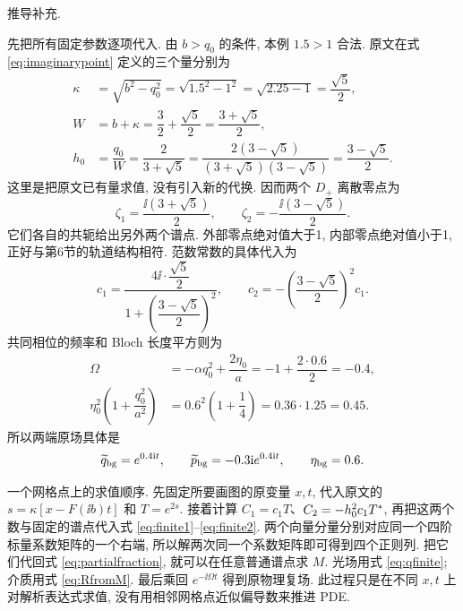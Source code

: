 \par\medskip\noindent 推导补充.\par

\par\smallskip\noindent 先把所有固定参数逐项代入.\quad
由 $b>q_0$ 的条件, 本例 $1.5>1$ 合法. 原文在式 \eqref{eq:imaginarypoint} 定义的三个量分别为
\begin{align*}
\kappa&=\sqrt{b^2-q_0^2}=\sqrt{1.5^2-1^2}
=\sqrt{2.25-1}=\dfrac{\sqrt{5}}{2},\\
 W&=b+\kappa=\dfrac{3}{2}+\dfrac{\sqrt{5}}{2}
=\dfrac{3+\sqrt{5}}{2},\\
h_0&=\dfrac{q_0}{W}=\dfrac{2}{3+\sqrt{5}}
=\dfrac{2(3-\sqrt{5})}{(3+\sqrt{5})(3-\sqrt{5})}
=\dfrac{3-\sqrt{5}}{2}.
\end{align*}
这里是把原文已有量求值, 没有引入新的代换. 因而两个 $D_+$ 离散零点为
\begin{equation*}
\zeta_1=\dfrac{\ii(3+\sqrt{5})}{2},\qquad
\zeta_2=-\dfrac{\ii(3-\sqrt{5})}{2}.
\end{equation*}
它们各自的共轭给出另外两个谱点. 外部零点绝对值大于1, 内部零点绝对值小于1, 正好与第6节的轨道结构相符. 范数常数的具体代入为
\begin{equation*}
c_1=\dfrac{4\ii\cdot\dfrac{\sqrt{5}}{2}}
{1+\left(\dfrac{3-\sqrt{5}}{2}\right)^2},\qquad
c_2=-\left(\dfrac{3-\sqrt{5}}{2}\right)^2c_1.
\end{equation*}
共同相位的频率和 Bloch 长度平方则为
\begin{align*}
\Omega&=-\alpha q_0^2+\dfrac{2\eta_0}{a}
=-1+\dfrac{2\cdot0.6}{2}=-0.4,\\
\eta_0^2\left(1+\dfrac{q_0^2}{a^2}\right)
&=0.6^2\left(1+\dfrac{1}{4}\right)
=0.36\cdot1.25=0.45.
\end{align*}
所以两端原场具体是
\begin{equation*}
\widetilde q_{\rm bg}=e^{0.4\mathrm{i} t},\qquad
\widetilde p_{\rm bg}=-0.3\mathrm{i} e^{0.4\mathrm{i} t},\qquad
\eta_{\rm bg}=0.6.
\end{equation*}

\par\smallskip\noindent 一个网格点上的求值顺序.\quad
先固定所要画图的原变量 $x,t$, 代入原文的 $s=\kappa[x-F(\ii b)t]$ 和 $T=e^{2s}$. 接着计算 $C_1=c_1T$、$C_2=-h_0^2c_1{T}^{*}$, 再把这两个数与固定的谱点代入式 \eqref{eq:finite1}--\eqref{eq:finite2}. 两个向量分量分别对应同一个四阶标量系数矩阵的一个右端, 所以解两次同一个系数矩阵即可得到四个正则列. 把它们代回式 \eqref{eq:partialfraction}, 就可以在任意普通谱点求 $M$. 光场用式 \eqref{eq:qfinite}; 介质用式 \eqref{eq:RfromM}. 最后乘回 $e^{-\ii\Omega t}$ 得到原物理复场. 此过程只是在不同 $x,t$ 上对解析表达式求值, 没有用相邻网格点近似偏导数来推进 PDE.

